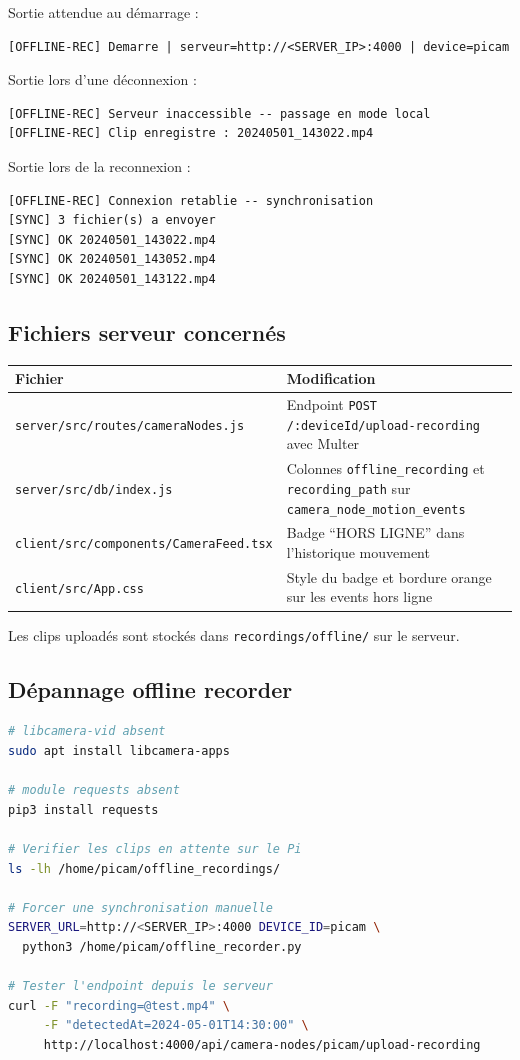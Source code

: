 \documentclass[12pt,a4paper]{article}
\begin{document}
Sortie attendue au démarrage :
\begin{lstlisting}
[OFFLINE-REC] Demarre | serveur=http://<SERVER_IP>:4000 | device=picam
\end{lstlisting}

Sortie lors d'une déconnexion :
\begin{lstlisting}
[OFFLINE-REC] Serveur inaccessible -- passage en mode local
[OFFLINE-REC] Clip enregistre : 20240501_143022.mp4
\end{lstlisting}

Sortie lors de la reconnexion :
\begin{lstlisting}
[OFFLINE-REC] Connexion retablie -- synchronisation
[SYNC] 3 fichier(s) a envoyer
[SYNC] OK 20240501_143022.mp4
[SYNC] OK 20240501_143052.mp4
[SYNC] OK 20240501_143122.mp4
\end{lstlisting}

\subsection{Fichiers serveur concernés}

\begin{longtable}{|l|p{9cm}|}
\hline
\textbf{Fichier} & \textbf{Modification} \\
\hline
\endhead
\hline
\endfoot
\texttt{server/src/routes/cameraNodes.js} & Endpoint \texttt{POST /:deviceId/upload-recording} avec Multer \\
\texttt{server/src/db/index.js} & Colonnes \texttt{offline\_recording} et \texttt{recording\_path} sur \texttt{camera\_node\_motion\_events} \\
\texttt{client/src/components/CameraFeed.tsx} & Badge ``HORS LIGNE'' dans l'historique mouvement \\
\texttt{client/src/App.css} & Style du badge et bordure orange sur les events hors ligne \\
\hline
\end{longtable}

Les clips uploadés sont stockés dans \texttt{recordings/offline/} sur le serveur.

\subsection{Dépannage offline recorder}

\begin{lstlisting}[language=bash]
# libcamera-vid absent
sudo apt install libcamera-apps

# module requests absent
pip3 install requests

# Verifier les clips en attente sur le Pi
ls -lh /home/picam/offline_recordings/

# Forcer une synchronisation manuelle
SERVER_URL=http://<SERVER_IP>:4000 DEVICE_ID=picam \
  python3 /home/picam/offline_recorder.py

# Tester l'endpoint depuis le serveur
curl -F "recording=@test.mp4" \
     -F "detectedAt=2024-05-01T14:30:00" \
     http://localhost:4000/api/camera-nodes/picam/upload-recording
\end{lstlisting}
\end{document}
